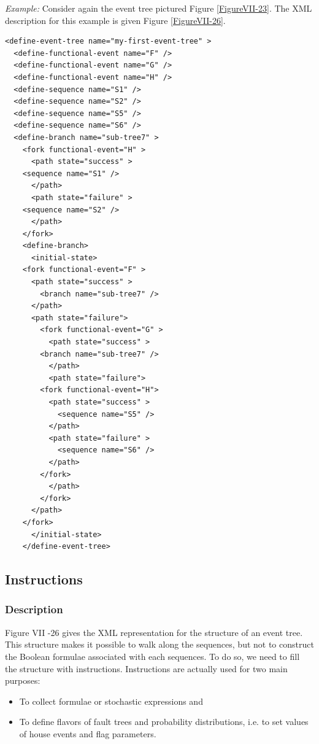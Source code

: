 \documentclass[11pt]{article}
\begin{document}
\emph{Example:} Consider again the event tree pictured Figure \ref{FigureVII-23}. The
XML description for this example is given Figure \ref{FigureVII-26}.


\begin{lstlisting}
<define-event-tree name="my-first-event-tree" >
  <define-functional-event name="F" />
  <define-functional-event name="G" />
  <define-functional-event name="H" />
  <define-sequence name="S1" />
  <define-sequence name="S2" />
  <define-sequence name="S5" />
  <define-sequence name="S6" />
  <define-branch name="sub-tree7" >
    <fork functional-event="H" >
      <path state="success" >
	<sequence name="S1" />
      </path>
      <path state="failure" >
	<sequence name="S2" />
      </path>
    </fork>
    <define-branch>
      <initial-state>
	<fork functional-event="F" >
	  <path state="success" >
	    <branch name="sub-tree7" />
	  </path>
	  <path state="failure">
	    <fork functional-event="G" >
	      <path state="success" >
		<branch name="sub-tree7" />
	      </path>
	      <path state="failure">
		<fork functional-event="H">
		  <path state="success" >
		    <sequence name="S5" />
		  </path>
		  <path state="failure" >
		    <sequence name="S6" />
		  </path>
		</fork>
	      </path>
	    </fork>
	  </path>
	</fork>
      </initial-state>
    </define-event-tree>
\end{lstlisting}


\subsection{Instructions}
\label{sec:org6dbfd75}

\subsubsection{Description}
\label{sec:org3205955}

Figure VII -26 gives the XML representation for the structure of an
event tree. This structure makes it possible to walk along the
sequences, but not to construct the Boolean formulae associated with
each sequences. To do so, we need to fill the structure with
instructions. Instructions are actually used for two main purposes:

\begin{itemize}
\item To collect formulae or stochastic expressions and

\item To define flavors of fault trees and probability distributions, i.e.
to set values of house events and flag parameters.
\end{itemize}
\end{document}
